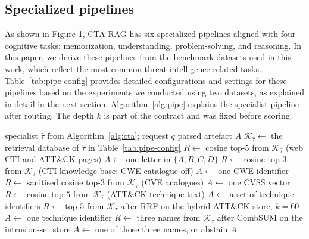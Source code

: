 \documentclass[5p,times,authoryear]{elsarticle}
\begin{document}
\subsection{Specialized pipelines}\label{sec:pipelines}
As shown in Figure 1, CTA-RAG has six specialized pipelines aligned with four cognitive tasks: memorization, understanding, problem-solving, and reasoning. In this paper, we derive these pipelines from the benchmark datasets used in this work, which reflect the most common threat intelligence-related tasks. Table~\ref{tab:pipe-config} provides detailed configurations and settings for these pipelines based on the experiments we conducted using two datasets, as explained in detail in the next section. Algorithm~\ref{alg:pipe} explains the specialist pipeline after routing.  The depth $k$ is part of the contract and was fixed before scoring.



\begin{algorithm}[t]
\caption{Specialist pipeline. Retrieval starts here: the label from Algorithm~\ref{alg:cta} selects one retrieval database, and the other databases stay closed.}
\label{alg:pipe}
\begin{algorithmic}[1]
\Require specialist $\hat{\tau}$ from Algorithm~\ref{alg:cta}; request $q$
\Ensure parsed artefact $A$
\State $\mathcal{K}_{\hat{\tau}} \gets$ the retrieval database of $\hat{\tau}$ in Table~\ref{tab:pipe-config}
  \State $R \gets$ cosine top-$5$ from $\mathcal{K}_{\hat{\tau}}$ (web CTI and ATT\&CK pages)
  \State $A \gets$ one letter in $\{A,B,C,D\}$
  \State $R \gets$ cosine top-$3$ from $\mathcal{K}_{\hat{\tau}}$ (CTI knowledge base; CWE catalogue off)
  \State $A \gets$ one CWE identifier
  \State $R \gets$ sanitised cosine top-$3$ from $\mathcal{K}_{\hat{\tau}}$ (CVE analogues)
  \State $A \gets$ one CVSS vector
  \State $R \gets$ cosine top-$5$ from $\mathcal{K}_{\hat{\tau}}$ (ATT\&CK technique text)
  \State $A \gets$ a set of technique identifiers
  \State $R \gets$ top-$5$ from $\mathcal{K}_{\hat{\tau}}$ after RRF on the hybrid ATT\&CK store, $k{=}60$
  \State $A \gets$ one technique identifier
\Else
  \State $R \gets$ three names from $\mathcal{K}_{\hat{\tau}}$ after CombSUM on the intrusion-set store
  \State $A \gets$ one of those three names, or abstain
\EndIf
\State \Return $A$
\end{algorithmic}
\end{algorithm}
\end{document}
